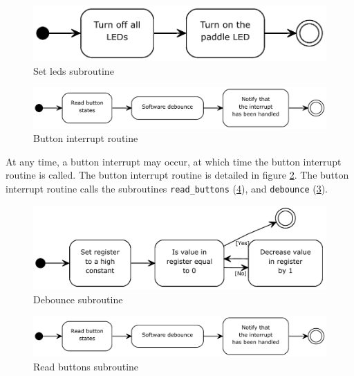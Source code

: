 \begin{figure}
\includegraphics[width = \textwidth]{description-and-methodology/program-flow/set-leds.pdf}
\caption{Set leds subroutine}
\label{fig:set-leds}
\end{figure}

\begin{figure}
\includegraphics[width = \textwidth]{description-and-methodology/program-flow/button-interrupt-routine.pdf}
\caption{Button interrupt routine}
\label{fig:button-interrupt-routine}
\end{figure}

At any time, a button interrupt may occur, at which time the button interrupt routine is called. The button interrupt routine is detailed in figure \ref{fig:button-interrupt-routine}. The button interrupt routine calls the subroutines \texttt{read\_buttons} (\ref{fig:read-buttons}), and \texttt{debounce} (\ref{fig:debounce}).

\begin{figure}
\includegraphics[width = \textwidth]{description-and-methodology/program-flow/debounce.pdf}
\caption{Debounce subroutine}
\label{fig:debounce}
\end{figure}

\begin{figure}
\includegraphics[width = \textwidth]{description-and-methodology/program-flow/read-buttons.pdf}
\caption{Read buttons subroutine}
\label{fig:read-buttons}
\end{figure}

